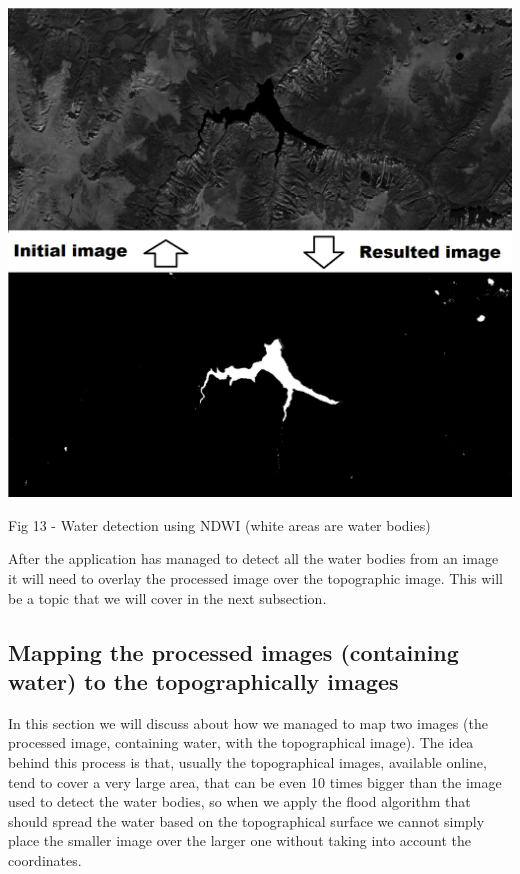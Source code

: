 \documentclass[12pt, a4paper]{report}
\begin{document}
\bigskip
\includegraphics[scale=0.4, left]{NDWI-prediction.png}
\begin{center}
Fig 13 - Water detection using NDWI (white areas are water bodies)
\end{center}
\par 

After the application has managed to detect all the water bodies from an image it will need to overlay the processed image over the topographic image. This will be a topic that we will cover in the next subsection.

\subsection{Mapping the processed images (containing water) to the topographically images}

\quad
In this section we will discuss about how we managed to map two images (the processed image, containing water, with the topographical image). The idea behind this process is that, usually the topographical images, available online, tend to cover a very large area, that can be even 10 times bigger than the image used to detect the water bodies, so when we apply the flood algorithm that should spread the water based on the topographical surface we cannot simply place the smaller image over the larger one without taking into account the coordinates. 
\par 
\end{document}
